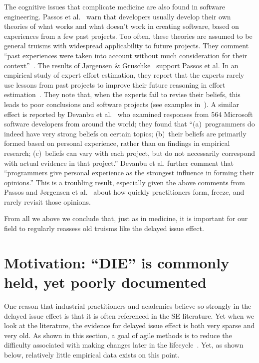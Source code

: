 \documentclass[smallcondensed]{svjour3}
\newcommand{\fig}[1]{Figure~\ref{fig:#1}}
\begin{document}
The cognitive issues that complicate medicine are also found in software engineering.
Passos et al.~\cite{passos11} warn that developers
usually develop their own theories of what works and what doesn't work in creating software, based on experiences from a few past
projects. Too often, these theories are assumed to be general truisms with widespread applicability to future projects. They comment ``past experiences were taken into account without 
much consideration for their context''~\cite{passos11}.
The results of J{\o}rgensen \& Gruschke~\cite{jorgensen09} support Passos et al. In an empirical study of expert effort estimation, they report that the experts rarely use lessons
  from past projects to improve their future reasoning in effort estimation~\cite{jorgensen09}. 
 They note that,
when the experts
  fail to revise their beliefs, this leads to poor
 conclusions and software projects  (see examples in~\cite{jorgensen09}).
 A similar effect is reported by
Devanbu et al.~\cite{prem16}  who examined responses from 564 Microsoft software developers from around
the world; they found that  ``(a)~programmers do indeed have very
strong beliefs on certain topics; (b)~their beliefs are primarily formed
based on personal experience, rather than on findings in empirical
research; (c)~beliefs can vary with each project, but do not necessarily
correspond with actual evidence in that project.''
Devanbu et al. further  comment that ``programmers give personal experience
as the strongest influence in forming their opinions.'' This is a troubling
result, especially given the above comments from Passos and  J{\o}rgensen et al.~\cite{passos11,jorgensen09} about how quickly practitioners form, freeze, and rarely revisit those opinions.

 
 
From all we above we conclude that, just as in medicine, 
 it is important for our field
 to regularly  reassess old truisms  like the  delayed issue effect.
  
 
 
\section{Motivation: ``DIE'' is commonly held, yet poorly documented}
\label{sect:belief}
One reason that industrial practitioners and academics believe so strongly in the delayed issue effect is that it is often referenced
in the SE literature. 
Yet when we look at the literature, the evidence for
delayed issue effect is both very sparse and very old.
As  shown in this section,
a goal of agile methods 
is to reduce the difficulty associated with making changes later in the lifecycle~\cite{beck00}. Yet, as shown below,
relatively little empirical data exists on this point.
\end{document}
